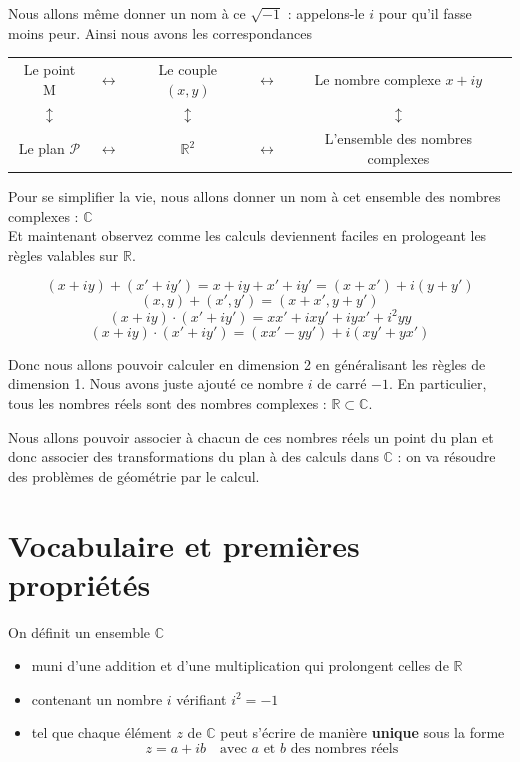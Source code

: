 \documentclass[french]{book}
\newcommand{\bbr}{\mathbb {R}}
\newcommand{\bbc}{\mathbb {C}}
\newcommand{\calp}{\mathscr{P}}
\newcommand{\PR}{\calp}
\begin{document}
Nous allons même  donner un nom à ce $\sqrt{-1}$  : appelons-le $i$ pour
qu'il fasse moins peur. Ainsi nous avons les correspondances 

\begin{center}
\begin{tabular}{ccccc}
Le   point   M   &$\longleftrightarrow$    &   Le   couple   $(x,y)$   &
$\longleftrightarrow$ & Le nombre complexe $x+iy$\\ 
$\updownarrow$ & &  $\updownarrow$ & & $\updownarrow$ \\
Le plan $\PR$  & $\longleftrightarrow$ & $\bbr^2$ &$\longleftrightarrow$
& L'ensemble des nombres complexes 
\end{tabular}
\end{center}


Pour se simplifier la vie, nous  allons donner un nom à cet ensemble des
nombres complexes : $\bbc$\\

Et  maintenant   observez  comme  les  calculs   deviennent  faciles  en
prologeant les règles valables sur $\bbr$.

$$(x+iy) + (x'+iy')= x+iy+x'+iy'=(x+x')+i(y+y')$$
$$(x,y)+(x',y')=(x+x',y+y')$$
$$(x+iy)\cdot(x'+iy')=xx'+ixy'+iyx'+i^2yy$$
$$(x+iy)\cdot(x'+iy')=(xx'-yy')+i(xy'+yx')$$


Donc nous  allons pouvoir  calculer en dimension  2 en  généralisant les
règles de  dimension 1. Nous avons  juste ajouté ce nombre  $i$ de carré
$-1$.   En  particulier,  tous   les  nombres  réels  sont  des  nombres
complexes : $\bbr\subset\bbc$.  

Nous allons pouvoir  associer à chacun de ces nombres  réels un point du
plan et  donc associer  des transformations du  plan à des  calculs dans
$\bbc$ : on va résoudre des problèmes de géométrie par le calcul. 
 

\section{Vocabulaire et premières propriétés}




  \begin{thm}[Ensemble $\bbc$]
On  définit un ensemble $\bbc$ 
\begin{itemize}
\item[$\bullet$] muni d'une addition et d'une multiplication qui prolongent celles de $\bbr$
\item[$\bullet$] contenant un nombre $i$ vérifiant $i^2=-1$ 
\item[$\bullet$]  tel que chaque  élément $z$  de $\bbc$  peut s'écrire  de manière
  \textbf{unique}  sous   la  forme   $$z=a+ib  \quad  \text{avec   }  a
  \text{ et } b \text{ des nombres réels}$$ 
\end{itemize}
    
    \end{thm}
  
\end{document}
